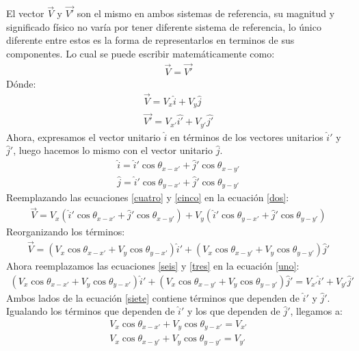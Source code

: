 \documentclass[12pt,letterpaper]{article}
\begin{document}
%
%
El vector $\overset{\rightarrow}{V}$ y $\overset{\rightarrow}{V'}$ son el mismo en ambos sistemas de referencia, su magnitud y significado físico no varía por tener diferente sistema de referencia, lo único diferente entre estos es la forma de representarlos en terminos de sus componentes. Lo cual se puede escribir matemáticamente como:
%
\begin{align}
	\overset{\rightarrow}{V} = \overset{\rightarrow}{V'}
	\label{uno}
\end{align}
%
Dónde:
%
\begin{align}
	\overset{\rightarrow}{V} = V_x \hat{i} + V_y \hat{j} \label{dos}\\
	\overset{\rightarrow}{V'} = V_{x'} \hat{i'} + V_{y'} \hat{j'} \label{tres}
\end{align}
%
Ahora, expresamos el vector unitario $\hat{i}$ en términos de los vectores unitarios $\hat{i}'$ y $\hat{j}'$, luego hacemos lo mismo con el vector unitario $\hat{j}$.
%
\begin{align}
	\hat{i} = \hat{i}' \cos \theta_{x-x'} +  \hat{j}' \cos \theta_{x-y'} \label{cuatro}\\
	\hat{j} = \hat{i}' \cos \theta_{y-x'} +  \hat{j}' \cos \theta_{y-y'} \label{cinco}
\end{align}
%
Reemplazando las ecuaciones \ref{cuatro} y \ref{cinco} en la ecuación \ref{dos}:
%
\begin{align*}
	\overset{\rightarrow}{V} = V_x \left( \hat{i}' \cos \theta_{x-x'} + \hat{j}' \cos \theta_{x-y'} \right) + V_y \left( \hat{i}' \cos \theta_{y-x'} + \hat{j}' \cos \theta_{y-y'} \right)
\end{align*}
%
Reorganizando los términos:
%
\begin{align}
	\overset{\rightarrow}{V} = \left( V_x \cos \theta_{x-x'} + V_y \cos \theta_{y-x'} \right) \hat{i}'+ \left( V_x \cos \theta_{x-y'} + V_y \cos \theta_{y-y'} \right) \hat{j}' \label{seis}
\end{align}
%
Ahora reemplazamos las ecuaciones \ref{seis} y \ref{tres} en la ecuación \ref{uno}:
%
\begin{align}
	\left( V_x \cos \theta_{x-x'} + V_y \cos \theta_{y-x'} \right) \hat{i}'+ \left( V_x \cos \theta_{x-y'} + V_y \cos \theta_{y-y'} \right) \hat{j}' = V_{x'} \hat{i}' + V_{y'} \hat{j}' \label{siete}
\end{align}
%
Ambos lados de la ecuación \ref{siete} contiene términos que dependen de $\hat{i}'$
y $\hat{j}'$. Igualando los términos que dependen de $\hat{i}'$ y los que dependen de $\hat{j}'$, llegamos a:
%
\begin{align}
	V_x \cos \theta_{x-x'} + V_y \cos \theta_{y-x'} = V_{x'} \label{ocho}\\
	V_x \cos \theta_{x-y'} + V_y \cos \theta_{y-y'} = V_{y'} \label{nueve}
\end{align}
\end{document}
